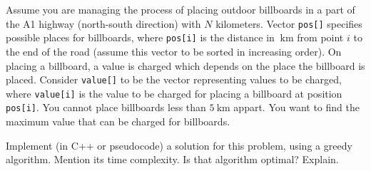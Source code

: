 {
\renewcommand{\thechapter}{\arabic{chapter}N}
\setcounter{chapter}{15}

Assume you are managing the process of placing outdoor billboards in a part of the A1 highway (north-south direction) with $N$ kilometers. Vector \texttt{pos[]} specifies possible places for billboards, where \texttt{pos[i]} is the distance in $\SI{}{\kilo\metre}$ from point $i$ to the end of the road (assume this vector to be sorted in increasing order). On placing a billboard, a value is charged which depends on the place the billboard is placed. Consider \texttt{value[]} to be the vector representing values to be charged, where \texttt{value[i]} is the value to be charged for placing a billboard at position \texttt{pos[i]}. You cannot place billboards less than $\SI{5}{\kilo\metre}$ appart. You want to find the maximum value that can be charged for billboards.

Implement (in C++ or pseudocode) a solution for this problem, using a greedy algorithm. Mention its time complexity. Is that algorithm optimal? Explain.

\ansseparator



}
